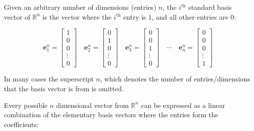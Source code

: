 \documentclass{article}
\begin{document}
Given an arbitrary number of dimensions (entries) \(n\), the \(i^\text{th}\) standard basis vector of \(\mathbb{R}^n\) is the vector where the \(i^\text{th}\) entry is \(1\), and all other entries are \(0\):

\[\mathbf{e}^n_{1} = \begin{bmatrix} 1 \\ 0 \\ 0 \\ \vdots \\ 0 \end{bmatrix} \quad \mathbf{e}^n_{2} = \begin{bmatrix} 0 \\ 1 \\ 0 \\ \vdots \\ 0 \end{bmatrix} \quad \mathbf{e}^n_{3} = \begin{bmatrix} 0 \\ 0 \\ 1 \\ \vdots \\ 0 \end{bmatrix} \quad \cdots \quad \mathbf{e}^n_{n} = \begin{bmatrix} 0 \\ 0 \\ 0 \\ \vdots \\ 1 \end{bmatrix}\]

In many cases the superscript \(n\), which denotes the number of entries/dimensions that the basis vector is from is omitted.

Every possible \(n\) dimensional vector from \(\mathbb{R}^n\) can be expressed as a linear combination of the elementary basis vectors where the entries form the coefficients: 
\end{document}
